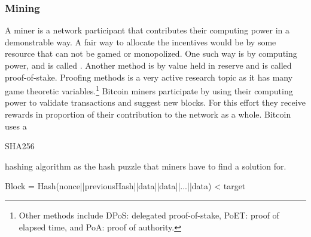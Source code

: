 \subsubsection*{Mining}
A miner is a network participant that contributes their computing power in a demonstrable way. A fair way to allocate the incentives would be by some resource that can not be gamed or monopolized. One such way is by computing power, and is called . Another method is by value held in reserve and is called proof-of-stake. Proofing methods is a very active research topic as it has many game theoretic variables.\footnote{Other methods include DPoS: delegated proof-of-stake, PoET: proof of elapsed time, and PoA: proof of authority.} Bitcoin miners participate by using their computing power to validate transactions and suggest new blocks. For this effort they receive rewards in proportion of their contribution to the network as a whole. Bitcoin uses a \begin{code}SHA256\end{code} hashing algorithm as the hash puzzle that miners have to find a solution for.
\begin{center}
\begin{code}
	Block = Hash(nonce||previousHash||data||data||...||data) < target
\end{code}
\end{center}

